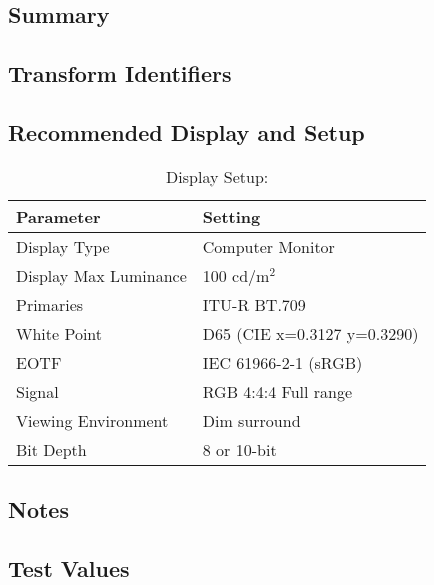 \section[sRGB (D60 sim)]{\shortName{}}
\label{sec:odt-details-\id}

\subsection{Summary}
\label{subsec:summary-\id}

\lipsum[1-2] %

\subsection{Transform Identifiers} 
\label{subsec:odt-ident-\id}

\subsection{Recommended Display and Setup}
\label{subsec:setup-\id}

\begin{table}[ht!]
    \centering
        \begin{tabular}{|p{1.5in}|p{3in}|}
            \hline
            \textbf{Parameter} 		& 	\textbf{Setting} 				 		\\ \hline
            Display Type 			&	Computer Monitor						\\ \hline
            Display Max Luminance 	& 	100 cd/m$^2$							\\ \hline
            Primaries	 			& 	ITU-R BT.709							\\ \hline
            White Point	 			& 	D65 (CIE x=0.3127 y=0.3290)				\\ \hline
            EOTF					& 	IEC 61966-2-1 (sRGB)		 			\\ \hline
            Signal 					&	RGB 4:4:4 Full range					\\ \hline
            Viewing Environment 	& 	Dim surround							\\ \hline
            Bit Depth 				& 	8 or 10-bit	 							\\ \hline 
    \end{tabular}
    \caption{Display Setup: \shortName{}} 
    \label{tab:setup-\id}
\end{table}

\subsection{Notes}
\label{subsec:notes-\id}

\lipsum[1-2] %


\subsection{Test Values}
\label{subsec:testValues-\id}

\testValuesSubSec{}

